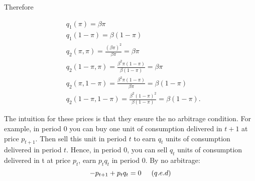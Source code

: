 \documentclass[12pt,a4paper]{article}
\begin{document}
\begin{itemize}
  Therefore

  \begin{align*}
    & q_1(\pi) = \beta \pi \\
    & q_1(1 - \pi) = \beta (1 - \pi) \\
    & q_2(\pi, \pi) = \frac{(\beta\pi)^2}{\beta \pi} = \beta \pi \\
    & q_2(1 - \pi, \pi) = \frac{\beta^2\pi(1-\pi)}{\beta (1 - \pi)} = \beta \pi \\
    & q_2(\pi, 1 - \pi) = \frac{\beta^2\pi(1-\pi)}{\beta \pi} = \beta ( 1 - \pi) \\
    & q_2(1 - \pi, 1 - \pi) = \frac{\beta^2(1-\pi)^2}{\beta (1 - \pi)} = \beta (1 - \pi).
  \end{align*}

\end{itemize}

\item The intuition for these prices is that they ensure the no arbitrage condition. For example, in period 0 you can buy one unit of consumption delivered in $t+1$ at price $p_{t+1}$. Then sell this unit in period $t$ to earn $q_{t}$ units of consumption delivered in period $t$. Hence, in period 0, you can sell $q_t$ units of consumption delivered in t at price $p_t$, earn $p_{t}q_{t}$ in period 0. By no arbitrage:
\begin{equation*}
    -p_{t+1}+p_tq_t=0 \hspace{5mm}(q.e.d)
\end{equation*}
\end{document}
